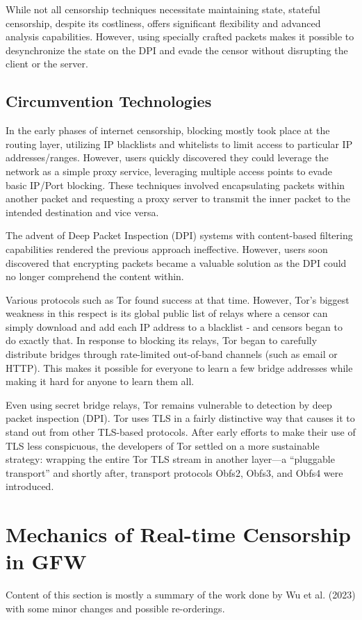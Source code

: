 While not all censorship techniques necessitate maintaining state, stateful censorship, despite its costliness, offers significant flexibility and advanced analysis capabilities. However, using specially crafted packets makes it possible to desynchronize the state on the DPI and evade the censor without disrupting the client or the server.

\subsection{Circumvention Technologies}
In the early phases of internet censorship, blocking mostly took place at the routing layer, utilizing IP blacklists and whitelists to limit access to particular IP addresses/ranges. However, users quickly discovered they could leverage the network as a simple proxy service, leveraging multiple access points to evade basic IP/Port blocking. These techniques involved encapsulating packets within another packet and requesting a proxy server to transmit the inner packet to the intended destination and vice versa.

The advent of Deep Packet Inspection (DPI) systems with content-based filtering capabilities rendered the previous approach ineffective. However, users soon discovered that encrypting packets became a valuable solution as the DPI could no longer comprehend the content within.\cite{leberknight2010taxonomy}

Various protocols such as Tor found success at that time. However, Tor’s biggest weakness in this respect is its global public list of relays where a censor can simply download and add each IP address to a blacklist - and censors began to do exactly that. In response to blocking its relays, Tor began to carefully distribute bridges through rate-limited out-of-band channels (such as email or HTTP). This makes it possible for everyone to learn a few bridge addresses while making it hard for anyone to learn them all.

Even using secret bridge relays, Tor remains vulnerable to detection by deep packet inspection (DPI). Tor uses TLS in a fairly distinctive way that causes it to stand out from other TLS-based protocols. After early efforts to make their use of TLS less conspicuous, the developers of Tor settled on a more sustainable strategy: wrapping the entire Tor TLS stream in another layer—a “pluggable transport” and shortly after, transport protocols Obfs2, Obfs3, and Obfs4 were introduced.\cite{ensafi2015firewall}

\section{Mechanics of Real-time Censorship in GFW}
Content of this section is mostly a summary of the work done by Wu et al. (2023) with some minor changes  and possible re-orderings.\cite{wu2023great}

